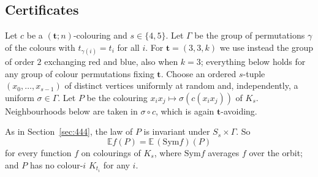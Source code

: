 \documentclass[11pt]{article}
\theoremstyle{spacedplain}
\theoremstyle{spaceddef}
\theoremstyle{spacedremark}
\newcommand{\bt}{\mathbf{t}}
\begin{document}
\subsection{Certificates}\label{sec:cert}

Let $c$ be a $(\bt;n)$-colouring and $s\in\{4,5\}$.
Let $\Gamma$ be the group of permutations $\gamma$ of the colours with $t_{\gamma(i)}=t_i$ for all $i$.
For $\bt=(3,3,k)$ we use instead the group of order $2$ exchanging red and blue, also when $k=3$; everything below holds for any group of colour permutations fixing $\bt$.
Choose an ordered $s$-tuple $(x_0,\dots,x_{s-1})$ of distinct vertices uniformly at random and, independently, a uniform $\sigma\in\Gamma$.
Let $P$ be the colouring $x_ix_j\mapsto\sigma(c(x_ix_j))$ of $K_s$.
Neighbourhoods below are taken in $\sigma\circ c$, which is again $\bt$-avoiding.

As in Section~\ref{sec:444}, the law of $P$ is invariant under $S_s\times\Gamma$.
So
\[
\mathbb E f(P)=\mathbb E\,(\mathrm{Sym} f)(P)
\]
for every function $f$ on colourings of $K_s$, where $\mathrm{Sym} f$ averages $f$ over the orbit; and $P$ has no colour-$i$ $K_{t_i}$ for any $i$.
\end{document}
